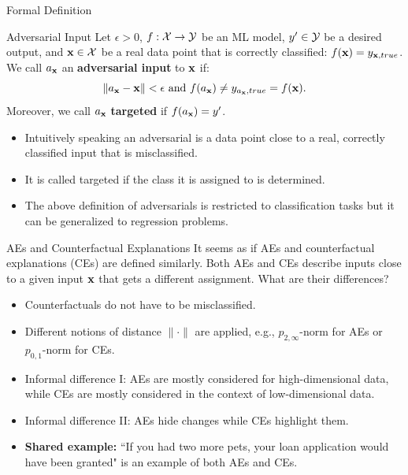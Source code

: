 \documentclass[11pt,compress,t,notes=noshow, aspectratio=169, xcolor=table]{beamer}
\begin{document}
\begin{vbframe}{Formal Definition}
\begin{block}{Adversarial Input}
Let $\epsilon>0$, $f:\Xspace \rightarrow \Yspace$ be an ML model, $y'\in \Yspace$ be a desired output, and $\xv \in \Xspace$ be a real data point that is correctly classified: $f(\xv)=y_{\xv,true}$. \\ 
 We call $a_{\xv}$ an \textbf{adversarial input} to $\xv$ if:
\begin{equation*}
    \| a_{\xv}- \xv\|<\epsilon\text{ and } f(a_{\xv})\neq y_{a_{\xv},true}=f(\xv).
\end{equation*}
Moreover, we call $a_{\xv}$ \textbf{targeted} if $f(a_{\xv})=y'$.
\end{block}
\begin{itemize}
    \item Intuitively speaking an adversarial is a data point close to a real, correctly classified input that is misclassified.
    \item It is called targeted if the class it is assigned to is determined.
    \item The above definition of adversarials is restricted to classification tasks but it can be generalized to regression problems.
\end{itemize}
\end{vbframe}


\begin{vbframe}{AEs and Counterfactual Explanations}
It seems as if AEs and counterfactual explanations (CEs) are defined similarly. Both AEs and CEs describe inputs close to a given input $\xv$ that gets a different assignment. What are their differences?
\begin{itemize}
    \item Counterfactuals do not have to be misclassified.
    \item Different notions of distance $\|\cdot\|$ are applied, e.g., $p_{2,\infty}$-norm for AEs or $p_{0,1}$-norm for CEs.
    \item Informal difference I: AEs are mostly considered for high-dimensional data, while CEs are mostly considered in the context of low-dimensional data.
    \item Informal difference II: AEs hide changes while CEs highlight them.
    \item \textbf{Shared example:} ``If you had two more pets, your loan application would have been granted" is an example of both AEs and CEs.
\end{itemize}
\end{vbframe}
\end{document}
